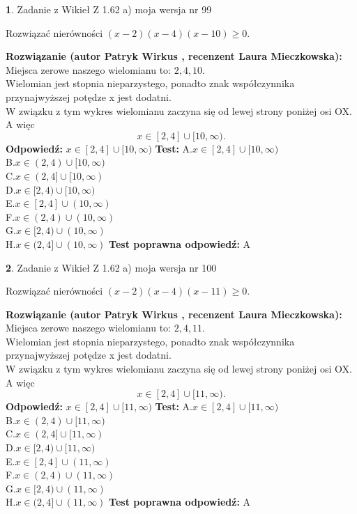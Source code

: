 \documentclass[12pt, a4paper]{article}
\theoremstyle{definition} %
\newtheorem{zad}{}
\newcommand{\zadStart}[1]{\begin{zad}#1\newline}
\newcommand{\zadStop}{\end{zad}}
\newcommand{\rozwStart}[2]{\noindent \textbf{Rozwiązanie (autor #1 , recenzent #2): }\newline}
\newcommand{\rozwStop}{\newline}
\newcommand{\odpStart}{\noindent \textbf{Odpowiedź:}\newline}
\newcommand{\odpStop}{\newline}
\newcommand{\testStart}{\noindent \textbf{Test:}\newline}
\newcommand{\testStop}{\newline}
\newcommand{\kluczStart}{\noindent \textbf{Test poprawna odpowiedź:}\newline}
\newcommand{\kluczStop}{\newline}
\begin{document}
\zadStart{Zadanie z Wikieł Z 1.62 a) moja wersja nr 99}

Rozwiązać nierówności $(x-2)(x-4)(x-10)\ge0$.
\zadStop
\rozwStart{Patryk Wirkus}{Laura Mieczkowska}
Miejsca zerowe naszego wielomianu to: $2, 4, 10$.\\
Wielomian jest stopnia nieparzystego, ponadto znak współczynnika przy\linebreak najwyższej potędze x jest dodatni.\\ W związku z tym wykres wielomianu zaczyna się od lewej strony poniżej osi OX. A więc $$x \in [2,4] \cup [10,\infty).$$
\rozwStop
\odpStart
$x \in [2,4] \cup [10,\infty)$
\odpStop
\testStart
A.$x \in [2,4] \cup [10,\infty)$\\
B.$x \in (2,4) \cup [10,\infty)$\\
C.$x \in (2,4] \cup [10,\infty)$\\
D.$x \in [2,4) \cup [10,\infty)$\\
E.$x \in [2,4] \cup (10,\infty)$\\
F.$x \in (2,4) \cup (10,\infty)$\\
G.$x \in [2,4) \cup (10,\infty)$\\
H.$x \in (2,4] \cup (10,\infty)$
\testStop
\kluczStart
A
\kluczStop



\zadStart{Zadanie z Wikieł Z 1.62 a) moja wersja nr 100}

Rozwiązać nierówności $(x-2)(x-4)(x-11)\ge0$.
\zadStop
\rozwStart{Patryk Wirkus}{Laura Mieczkowska}
Miejsca zerowe naszego wielomianu to: $2, 4, 11$.\\
Wielomian jest stopnia nieparzystego, ponadto znak współczynnika przy\linebreak najwyższej potędze x jest dodatni.\\ W związku z tym wykres wielomianu zaczyna się od lewej strony poniżej osi OX. A więc $$x \in [2,4] \cup [11,\infty).$$
\rozwStop
\odpStart
$x \in [2,4] \cup [11,\infty)$
\odpStop
\testStart
A.$x \in [2,4] \cup [11,\infty)$\\
B.$x \in (2,4) \cup [11,\infty)$\\
C.$x \in (2,4] \cup [11,\infty)$\\
D.$x \in [2,4) \cup [11,\infty)$\\
E.$x \in [2,4] \cup (11,\infty)$\\
F.$x \in (2,4) \cup (11,\infty)$\\
G.$x \in [2,4) \cup (11,\infty)$\\
H.$x \in (2,4] \cup (11,\infty)$
\testStop
\kluczStart
A
\kluczStop
\end{document}
